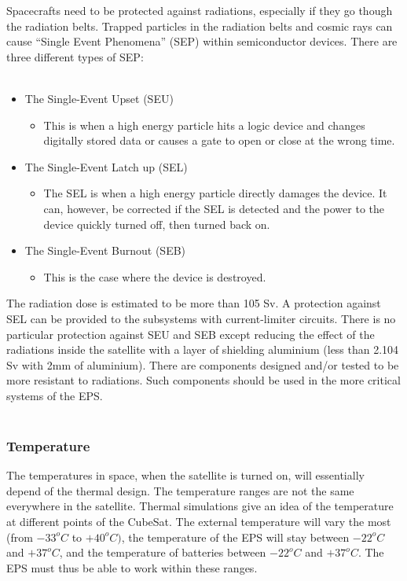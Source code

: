 Spacecrafts need to be protected against radiations, especially if they go though the radiation belts. Trapped particles in the radiation belts and cosmic rays can cause “Single Event Phenomena” (SEP) within semiconductor devices. There are three different types of SEP:
\\ \\
\begin{itemize}
\item The Single-Event Upset (SEU)
\begin{itemize}
\item This is when a high energy particle hits a logic device and changes digitally stored data or causes a gate to open or close at the wrong time.
\end{itemize}
\item The Single-Event Latch up (SEL)
\begin{itemize}
\item The SEL is when a high energy particle directly damages the device. It can, however, be corrected if the SEL is detected and the power to the device quickly turned off, then turned back on.
\end{itemize}
\item The Single-Event Burnout (SEB)
\begin{itemize}
\item This is the case where the device is destroyed.
\end{itemize}

\end{itemize}


The radiation dose is estimated to be more than 105 Sv. A protection against SEL can be provided to the subsystems with current-limiter circuits. There is no particular protection against SEU and SEB except reducing the effect of the radiations inside the satellite with a layer of shielding aluminium (less than 2.104 Sv with 2mm of aluminium). There are components designed and/or tested to be more resistant to radiations. Such components should be used in the more critical systems of the EPS.
\\ \\
\subsubsection{Temperature}

The temperatures in space, when the satellite is turned on, will essentially depend of the thermal design. The temperature ranges are not the same everywhere in the satellite. Thermal simulations give an idea of the temperature at different points of the CubeSat. The external temperature will vary the most (from $-33^{o}C$ to $+40^{o}C)$, the temperature of the EPS will stay between $-22^{o}C$ and $+37^{o}C$, and the temperature of batteries between $-22^{o}C$ and $+37^{o}C$. The EPS must thus be able to work within these ranges.

